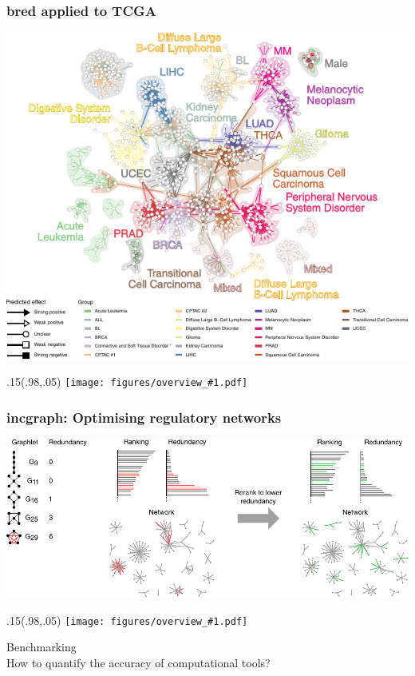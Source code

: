 \documentclass[usepdftitle=false, compress]{beamer}
\newcommand{\topright}[1]{%
\begin{textblock*}{.15\linewidth}(.98\linewidth,.05\linewidth)
	\texttt{[image: figures/overview\_\#1.pdf]}
\end{textblock*}}
\begin{document}
\begin{frame}
	\frametitle{bred applied to TCGA}
	\begin{center}
		\includegraphics[width=.85\linewidth]{figures/10b_tcga.pdf}
	\end{center}
	\topright{ch6}
\end{frame}

\begin{frame}
	\frametitle{incgraph: Optimising regulatory networks}
	\begin{center}
		\includegraphics[width=\linewidth]{figures/end_part_incgraph.pdf}
	\end{center}
	\topright{ch7}
\end{frame}

\begin{frame}
	\vfill
	\begin{center}
		\color{set1blue}
		{\LARGE Benchmarking} \\
		How to quantify the accuracy of computational tools?
	\end{center}
	\vfill
\end{frame}
\end{document}
